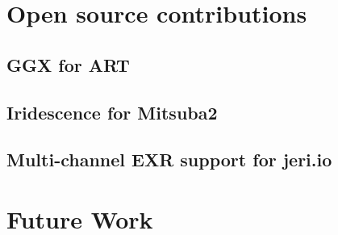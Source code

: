 \section{Open source contributions}

\subsection{GGX for ART}

\subsection{Iridescence for Mitsuba2}

\subsection{Multi-channel EXR support for jeri.io}

\section{Future Work}